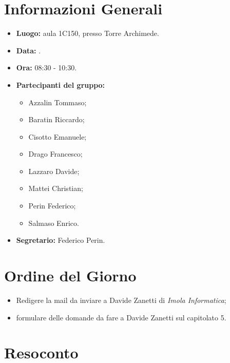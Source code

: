 \section{Informazioni Generali}
\begin{itemize}
\item \textbf{Luogo:} aula 1C150, presso Torre Archimede.
\item \textbf{Data:} \Data.
\item \textbf{Ora:} 08:30 - 10:30.
\item \textbf{Partecipanti del gruppo:}
	\begin{itemize}
		\item Azzalin Tommaso; 
		\item Baratin Riccardo;
		\item Cisotto Emanuele; 
		\item Drago Francesco;
		\item Lazzaro Davide;
		\item Mattei Christian;
		\item Perin Federico;
		\item Salmaso Enrico.
	\end{itemize} 
\item \textbf{Segretario:} Federico Perin.
\end{itemize}

\section{Ordine del Giorno}
\begin{itemize}
	\item Redigere la mail da inviare a Davide Zanetti di \textit{Imola Informatica};
	\item formulare delle domande da fare a Davide Zanetti sul capitolato 5.
\end{itemize}

\section{Resoconto}

